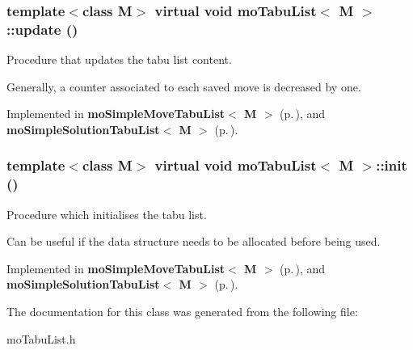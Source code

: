 \subsubsection{\setlength{\rightskip}{0pt plus 5cm}template$<$class M$>$ virtual void {\bf mo\-Tabu\-List}$<$ M $>$::update ()\hspace{0.3cm}{\tt  [pure virtual]}}\label{classmo_tabu_list_a1}


Procedure that updates the tabu list content. 

Generally, a counter associated to each saved move is decreased by one. 

Implemented in {\bf mo\-Simple\-Move\-Tabu\-List$<$ M $>$} {\rm (p.\,\pageref{classmo_simple_move_tabu_list_a3})}, and {\bf mo\-Simple\-Solution\-Tabu\-List$<$ M $>$} {\rm (p.\,\pageref{classmo_simple_solution_tabu_list_a3})}.
\subsubsection{\setlength{\rightskip}{0pt plus 5cm}template$<$class M$>$ virtual void {\bf mo\-Tabu\-List}$<$ M $>$::init ()\hspace{0.3cm}{\tt  [pure virtual]}}\label{classmo_tabu_list_a2}


Procedure which initialises the tabu list. 

Can be useful if the data structure needs to be allocated before being used. 

Implemented in {\bf mo\-Simple\-Move\-Tabu\-List$<$ M $>$} {\rm (p.\,\pageref{classmo_simple_move_tabu_list_a4})}, and {\bf mo\-Simple\-Solution\-Tabu\-List$<$ M $>$} {\rm (p.\,\pageref{classmo_simple_solution_tabu_list_a4})}.

The documentation for this class was generated from the following file:\begin{CompactItemize}
\item 
mo\-Tabu\-List.h\end{CompactItemize}

